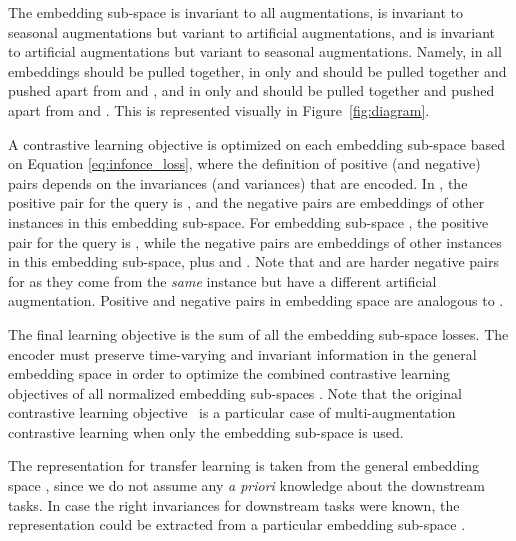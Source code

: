 \documentclass[10pt,twocolumn,letterpaper]{article}
\begin{document}
The embedding sub-space  is invariant to all augmentations,  is invariant to seasonal augmentations but variant to artificial augmentations, and  is invariant to artificial augmentations but variant to seasonal augmentations. Namely, in  all embeddings  should be pulled together, in  only  and  should be pulled together and pushed apart from  and , and in  only  and  should be pulled together and pushed apart from  and . This is represented visually in Figure~\ref{fig:diagram}.

A contrastive learning objective is optimized on each embedding sub-space based on Equation \ref{eq:infonce_loss}, where the definition of positive (and negative) pairs depends on the invariances (and variances) that are encoded. In , the positive pair for the query  is , and the negative pairs are embeddings of other instances in this embedding sub-space. For embedding sub-space , the positive pair for the query  is , while the negative pairs are embeddings of other instances in this embedding sub-space, plus  and . Note that  and  are harder negative pairs for  as they come from the \textit{same} instance but have a different artificial augmentation. Positive and negative pairs in embedding space  are analogous to . 

The final learning objective is the sum of all the embedding sub-space losses. The encoder  must preserve time-varying and invariant information in the general embedding space  in order to optimize the combined contrastive learning objectives of all normalized embedding sub-spaces . Note that the original contrastive learning objective~\cite{oord2018representation} is a particular case of multi-augmentation contrastive learning when only the embedding sub-space  is used.

The representation for transfer learning is taken from the general embedding space , since we do not assume any \textit{a priori} knowledge about the downstream tasks. In case the right invariances for downstream tasks were known, the representation could be extracted from a particular embedding sub-space .
\end{document}
